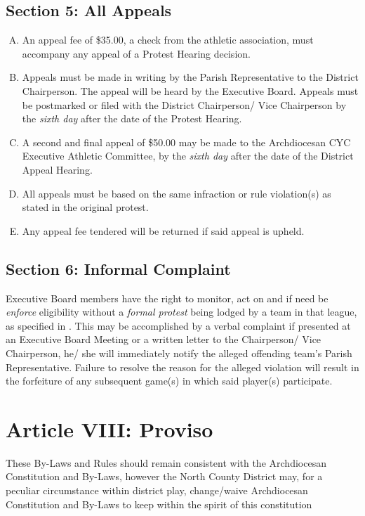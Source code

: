 \documentclass[letteraper,10pt,oneside,draft]{memoir}
\begin{document}
\subsection{Section 5: All Appeals}
\label{ssec:const-7-5}
\begin{enumerate}[A.]
    \item An appeal fee of \$35.00, a check from the athletic association, must accompany any appeal of a Protest Hearing decision.
    \item Appeals must be made in writing by the Parish Representative to the District Chairperson.  The appeal will be heard by the Executive Board.  Appeals must be postmarked or filed with the District Chairperson/ Vice Chairperson by the {\em sixth day} after the date of the Protest Hearing.
    \item A second and final appeal of \$50.00 may be made to the Archdiocesan CYC Executive Athletic Committee, by the {\em sixth day} after the date of the District Appeal Hearing.
    \item All appeals must be based on the same infraction or rule violation(s) as stated in the original protest.
    \item Any appeal fee tendered will be returned if said appeal is upheld.
\end{enumerate}

\subsection{Section 6: Informal Complaint}
\label{ssec:const-7-6}
Executive Board members have the right to monitor, act on and if need be {\em enforce} eligibility without a {\em formal protest} being lodged by a team in that league, as specified in .  This may be accomplished by a verbal complaint if presented at an Executive Board Meeting or a written letter to the Chairperson/ Vice Chairperson, he/ she will immediately notify the alleged offending team's Parish Representative.  Failure to resolve the reason for the alleged violation will result in the forfeiture of any subsequent game(s) in which said player(s) participate.

\section{Article VIII: Proviso}
\label{sec:const-8}
These By-Laws and Rules should remain consistent with the Archdiocesan Constitution and By-Laws, however the North County District may, for a peculiar circumstance within district play, change/waive Archdiocesan Constitution and By-Laws to keep within the spirit of this constitution
\end{document}
